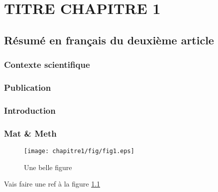 \chapter{TITRE CHAPITRE 1}
\label{chap1}

\section{Résumé en français du deuxième article}

\subsection{Contexte scientifique}

\subsection{Publication}
\subsection{Introduction}\label{introduction}

\subsection{Mat \& Meth}\label{mat-meth}

\begin{figure}[htbp]
\centering
\texttt{[image: chapitre1/fig/fig1.eps]}
\caption{Une belle figure\label{fig:chap1_1}}
\end{figure}

Vais faire une ref à la figure \ref{fig:chap1_1}
